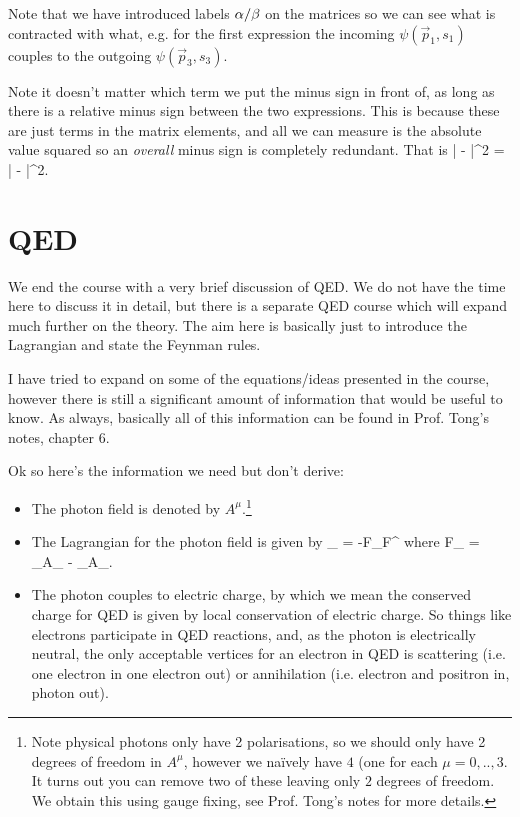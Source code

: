 \br 
    Note that we have introduced labels $\alpha/\beta$ on the matrices so we can see what is contracted with what, e.g. for the first expression the incoming $\psi(\vec{p}_1,s_1)$ couples to the outgoing $\psi(\vec{p}_3,s_3)$.
\er 

\br 
    Note it doesn't matter which term we put the minus sign in front of, as long as there is a relative minus sign between the two expressions. This is because these are just terms in the matrix elements, and all we can measure is the absolute value squared so an \textit{overall} minus sign is completely redundant. That is 
    \bse 
        | - |^2 = | - |^2.
    \ese 
\er 

\section{QED}

We end the course with a very brief discussion of QED. We do not have the time here to discuss it in detail, but there is a separate QED course which will expand much further on the theory. The aim here is basically just to introduce the Lagrangian and state the Feynman rules. 

\br 
    I have tried to expand on some of the equations/ideas presented in the course, however there is still a significant amount of information that would be useful to know. As always, basically all of this information can be found in Prof. Tong's notes, chapter 6.
\er 

Ok so here's the information we need but don't derive: 
\begin{itemize}
    \item The photon field is denoted by $A^{\mu}$.\footnote{Note physical photons only have 2 polarisations, so we should only have 2 degrees of freedom in $A^{\mu}$, however we na\"{i}vely have $4$ (one for each $\mu=0,..,3$. It turns out you can remove two of these leaving only $2$ degrees of freedom. We obtain this using gauge fixing, see Prof. Tong's notes for more details.}
    \item The Lagrangian for the photon field is given by 
    \be 
    \label{eqn:MaxwellLagrangian}
        \cL_{} = -F_{\mu\nu}F^{\mu\nu} 
    \ee 
    where 
    \bse 
        F_{\mu\nu} = \p_{\mu}A_{\nu} - \p_{\nu}A_{\mu}. 
    \ese 
    \item The photon couples to electric charge, by which we mean the conserved charge for QED is given by local conservation of electric charge. So things like electrons participate in QED reactions, and, as the photon is electrically neutral, the only acceptable vertices for an electron in QED is scattering (i.e. one electron in one electron out) or annihilation (i.e. electron and positron in, photon out). 
\end{itemize}

